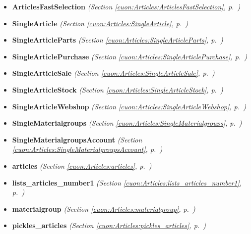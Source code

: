 \begin{itemize}
\setlength{\parskip}{0ex}
\item \textbf{ArticlesFastSelection}
  \textit{(Section \ref{cuon:Articles:ArticlesFastSelection}, p.~\pageref{cuon:Articles:ArticlesFastSelection})}

\item \textbf{SingleArticle}
  \textit{(Section \ref{cuon:Articles:SingleArticle}, p.~\pageref{cuon:Articles:SingleArticle})}

\item \textbf{SingleArticleParts}
  \textit{(Section \ref{cuon:Articles:SingleArticleParts}, p.~\pageref{cuon:Articles:SingleArticleParts})}

\item \textbf{SingleArticlePurchase}
  \textit{(Section \ref{cuon:Articles:SingleArticlePurchase}, p.~\pageref{cuon:Articles:SingleArticlePurchase})}

\item \textbf{SingleArticleSale}
  \textit{(Section \ref{cuon:Articles:SingleArticleSale}, p.~\pageref{cuon:Articles:SingleArticleSale})}

\item \textbf{SingleArticleStock}
  \textit{(Section \ref{cuon:Articles:SingleArticleStock}, p.~\pageref{cuon:Articles:SingleArticleStock})}

\item \textbf{SingleArticleWebshop}
  \textit{(Section \ref{cuon:Articles:SingleArticleWebshop}, p.~\pageref{cuon:Articles:SingleArticleWebshop})}

\item \textbf{SingleMaterialgroups}
  \textit{(Section \ref{cuon:Articles:SingleMaterialgroups}, p.~\pageref{cuon:Articles:SingleMaterialgroups})}

\item \textbf{SingleMaterialgroupsAccount}
  \textit{(Section \ref{cuon:Articles:SingleMaterialgroupsAccount}, p.~\pageref{cuon:Articles:SingleMaterialgroupsAccount})}

\item \textbf{articles}
  \textit{(Section \ref{cuon:Articles:articles}, p.~\pageref{cuon:Articles:articles})}

\item \textbf{lists\_articles\_number1}
  \textit{(Section \ref{cuon:Articles:lists_articles_number1}, p.~\pageref{cuon:Articles:lists_articles_number1})}

\item \textbf{materialgroup}
  \textit{(Section \ref{cuon:Articles:materialgroup}, p.~\pageref{cuon:Articles:materialgroup})}

\item \textbf{pickles\_articles}
  \textit{(Section \ref{cuon:Articles:pickles_articles}, p.~\pageref{cuon:Articles:pickles_articles})}

\end{itemize}

